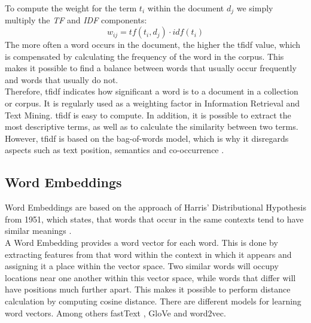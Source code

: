\documentclass[a4paper, 11pt,titlepage,oneside,openany]{book}
\begin{document}
\indent To compute the weight for the term $t_i$ within the document $d_j$ we simply multiply the \textit{TF} and \textit{IDF} components:
\[
w_{ij}=tf(t_i, d_j)\cdot idf(t_i)
\]
\indent The more often a word occurs in the document, the higher the \gls{tfidf} value, which is compensated by calculating the frequency of the word in the corpus. This makes it possible to find a balance between words that usually occur frequently and words that usually do not.\\
\newpage
Therefore, \Gls{tfidf} indicates how significant a word is to a document in a collection or corpus. It is regularly used as a weighting factor in Information Retrieval and Text Mining. \Gls{tfidf} is easy to compute. In addition, it is possible to extract the most descriptive terms, as well as to calculate the similarity between two terms. However, \gls{tfidf} is based on the bag-of-words model, which is why it disregards aspects such as text position, semantics and co-occurrence \cite{distributionalhypothesis}.

\subsection{Word Embeddings}
\indent Word Embeddings are based on the approach of Harris' Distributional Hypothesis from 1951, which states, that words that occur in the same contexts tend to have similar meanings \cite{distributionalhypothesis}. \\
\indent A Word Embedding provides a word vector for each word. This is done by extracting features from that word within the context in which it appears and assigning it a place within the vector space. Two similar words will occupy locations near one another within this vector space, while words that differ will have positions much further apart. This makes it possible to perform distance calculation by computing cosine distance. There are different models for learning word vectors. Among others fastText \cite{fasttext}, GloVe \cite{glove} and word2vec. \\
\end{document}
